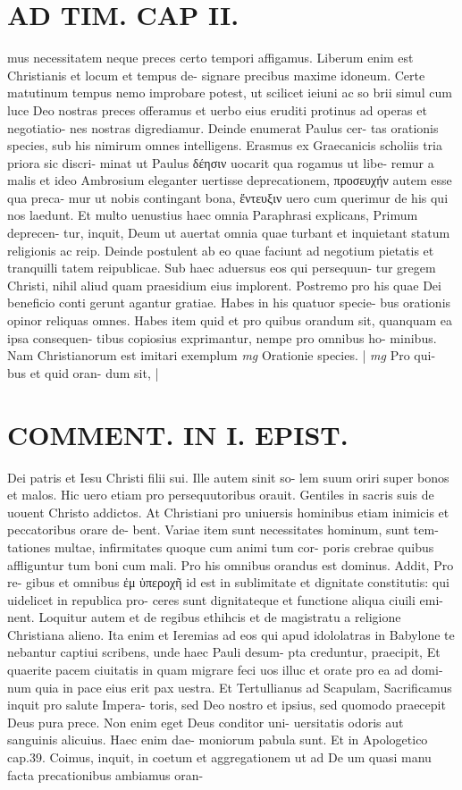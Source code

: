 \documentclass{article}
\begin{document}
\begin{pages}
\section*{AD TIM. CAP II. }
\marginpar{[ p.111 ]}\pstart mus necessitatem neque preces certo tempori affigamus. Liberum enim est Christianis et locum et tempus de- signare precibus maxime idoneum. Certe matutinum tempus nemo improbare potest, ut scilicet ieiuni ac so brii simul cum luce Deo nostras preces offeramus et uerbo eius eruditi protinus ad operas et negotiatio- nes nostras digrediamur. Deinde enumerat Paulus cer- tas orationis species, sub his nimirum omnes intelligens. Erasmus ex Graecanicis scholiis tria priora sic discri- minat ut Paulus δέησιν uocarit qua rogamus ut libe- remur a malis et ideo Ambrosium eleganter uertisse deprecationem, προσευχήν autem esse qua preca- mur ut nobis contingant bona, ἔντευξιν uero cum querimur de his qui nos laedunt. Et multo uenustius haec omnia Paraphrasi explicans, Primum deprecen- tur, inquit, Deum ut auertat omnia quae turbant et inquietant statum religionis ac reip. Deinde postulent ab eo quae faciunt ad negotium pietatis et tranquilli tatem reipublicae. Sub haec aduersus eos qui persequun- tur gregem Christi, nihil aliud quam praesidium eius implorent. Postremo pro his quae Dei beneficio conti gerunt agantur gratiae. Habes in his quatuor specie- bus orationis opinor reliquas omnes. Habes item quid et pro quibus orandum sit, quanquam ea ipsa consequen- tibus copiosius exprimantur, nempe pro omnibus ho- minibus. Nam Christianorum est imitari exemplum  \pend
\textit{mg}
\footnotesize Orationie species. 
\normalsize| 
\textit{mg}
\footnotesize Pro qui- bus et quid oran- dum sit, 
\normalsize| 
\section*{COMMENT. IN I. EPIST. }\pstart Dei patris et Iesu Christi filii sui. Ille autem sinit so- lem suum oriri super bonos et malos. Hic uero etiam pro persequutoribus orauit. Gentiles in sacris suis de uouent Christo addictos. At Christiani pro uniuersis hominibus etiam inimicis et peccatoribus orare de- bent. Variae item sunt necessitates hominum, sunt tem- tationes multae, infirmitates quoque cum animi tum cor- poris crebrae quibus affliguntur tum boni cum mali. Pro his omnibus orandus est dominus. Addit, Pro re- gibus et omnibus ἐμ ὑπεροχῆ id est in sublimitate et dignitate constitutis: qui uidelicet in republica pro- ceres sunt dignitateque et functione aliqua ciuili emi- nent. Loquitur autem et de regibus ethihcis et de magistratu a religione Christiana alieno. Ita enim et Ieremias ad eos qui apud idololatras in Babylone te nebantur captiui scribens, unde haec Pauli desum- pta creduntur, praecipit, Et quaerite pacem ciuitatis in quam migrare feci uos illuc et orate pro ea ad domi- num quia in pace eius erit pax uestra. Et Tertullianus ad Scapulam, Sacrificamus inquit pro salute Impera- toris, sed Deo nostro et ipsius, sed quomodo praecepit Deus pura prece. Non enim eget Deus conditor uni- uersitatis odoris aut sanguinis alicuius. Haec enim dae- moniorum pabula sunt. Et in Apologetico cap.39. Coimus, inquit, in coetum et aggregationem ut ad De um quasi manu facta precationibus ambiamus oran-  \pend

\end{pages}
\end{document}
